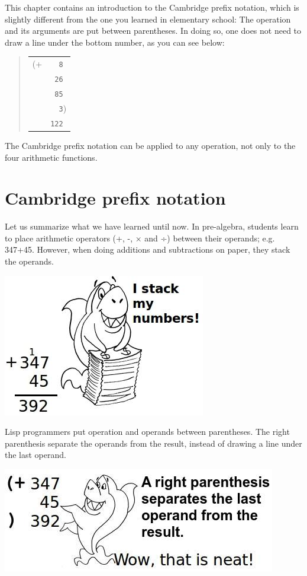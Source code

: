 \documentclass[a4paper,12pt]{book}
\begin{document}
This chapter contains an introduction to
the Cambridge prefix notation, 
which is slightly different from the one you
learned in elementary school: The operation
and its arguments are put between parentheses.
In doing so, one does not need to draw a line
under the bottom number, as you can see below:
\begin{quote}
\begin{tabular}{p{0.5cm}p{1cm}}
(+ &\verb|  8|\\
  &\verb| 26|\\
  &\verb| 85|\\
  &\verb|  3|)\\
  &\verb|122|
\end{tabular}
\end{quote}
The Cambridge prefix notation can be applied
to any operation, not only to the four arithmetic
functions. 

\section{Cambridge prefix notation}
Let us summarize what we have learned
until now. In pre-algebra, students
learn to place arithmetic operators (+, -, × and ÷)
between their operands; e.g. 347+45.
However, when doing additions and subtractions
on paper, they stack the operands.

\includegraphics{figs-prefix/stackshark.jpg}


Lisp programmers put operation and operands
between parentheses. The right parenthesis
separate the operands from the result,
instead of drawing a line under the last operand.

\includegraphics{figs-prefix/neatsum.jpg}
\end{document}
